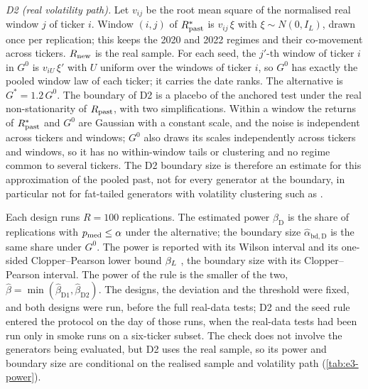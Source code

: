 \emph{D2 (real volatility path).} Let $v_{ij}$ be the root mean square of the
normalised real \TRAIN{} window $j$ of ticker $i$. Window $(i,j)$ of $R_{\mathrm{past}}^*$ is
$v_{ij}\,\xi$ with $\xi\sim N(0,I_L)$, drawn once per replication; this keeps the 2020
and 2022 regimes and their co-movement across tickers. $R_{\mathrm{new}}$ is the real \TEST{} sample.
For each seed, the $j'$-th window of ticker $i$ in $G^0$ is $v_{iU}\,\xi'$ with $U$ uniform
over the \TRAIN{} windows of ticker $i$, so $G^0$ has exactly the pooled \TRAIN{} window law
of each ticker; it carries the \TEST{} date ranks. The alternative is $G^*=1.2\,G^0$. The
boundary of D2 is a placebo of the anchored test under the real non-stationarity of
$R_{\mathrm{past}}$, with two simplifications. Within a window the returns of $R_{\mathrm{past}}^*$ and $G^0$ are Gaussian with a
constant scale, and the noise is independent across tickers and windows; $G^0$ also draws
its scales independently across tickers and windows, so it has no within-window tails or
clustering and no regime common to several tickers. The D2 boundary size is therefore an
estimate for this approximation of the pooled past, not for every generator at the
boundary, in particular not for fat-tailed generators with volatility clustering such as
\GARCHt{}.

Each design runs $R=100$ replications. The estimated power $\hat\beta_{\mathrm{D}}$ is the share
of replications with $p_{\mathrm{med}}\le\alpha$ under the alternative; the boundary size
$\hat\alpha_{\mathrm{bd},\mathrm{D}}$ is the same share under $G^0$. The power is reported with
its Wilson interval and its one-sided Clopper--Pearson lower bound $\beta_{L}$
\citep{clopper_1934_use}, the boundary size with its Clopper--Pearson interval. The power of the
rule is the smaller of the two, $\hat\beta=\min(\hat\beta_{\mathrm{D1}},\hat\beta_{\mathrm{D2}})$. The designs, the deviation and
the threshold were fixed, and both designs were run, before the full real-data tests; D2 and the
seed rule entered the protocol on the day of those runs, when the real-data tests had been run
only in smoke runs on a six-ticker subset. The check does not involve the generators being
evaluated, but D2 uses the real \TEST{} sample, so its power and boundary size are conditional on
the realised \TEST{} sample and \TRAIN{} volatility path (\cref{tab:e3-power}).

